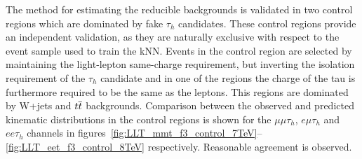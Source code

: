 The method for estimating the reducible backgrounds is validated in two control regions which are dominated by fake $\tau_h$ candidates.
These control regions provide an independent validation, as they are naturally exclusive with respect to the event sample used to train the kNN. Events in the control region are selected by maintaining
the light-lepton same-charge requirement, but inverting the isolation requirement of the $\tau_h$ candidate and in one of the regions the charge of the tau is furthermore required to be the same as the leptons.
This regions are dominated by W+jets and $t\overline{t}$ backgrounds.
Comparison between the observed and predicted kinematic distributions in the control regions is shown for the $\mu\mu\tau_h$, $e\mu\tau_h$ and $ee\tau_h$ channels in figures~\ref{fig:LLT_mmt_f3_control_7TeV}--\ref{fig:LLT_eet_f3_control_8TeV} respectively.
Reasonable agreement is observed.%

